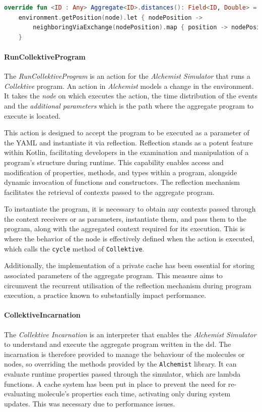\begin{lstlisting}[language=kt,label={lst:distance},caption={The implementation of the \texttt{distance} function.}]
override fun <ID : Any> Aggregate<ID>.distances(): Field<ID, Double> =
    environment.getPosition(node).let { nodePosition ->
        neighboringViaExchange(nodePosition).map { position -> nodePosition.distanceTo(position) }
    }
\end{lstlisting}

\paragraph{RunCollektiveProgram}
\label{par:run-collektive-program}
The \emph{RunCollektiveProgram} is an action for the \emph{Alchemist Simulator} that runs a \emph{Collektive} program.
An action in \emph{Alchemist} models a change in the environment.
It takes the \emph{node} on which executes the action, the time distribution of the events and the \emph{additional parameters}
which is the path where the aggregate program to execute is located.

This action is designed to accept the program to be executed as a parameter of the YAML and instantiate it via reflection.
Reflection stands as a potent feature within Kotlin, facilitating developers in the examination and manipulation of a program's structure during runtime.
This capability enables access and modification of properties, methods, and types within a program, alongside dynamic invocation of functions and constructors.
The reflection mechanism facilitates the retrieval of contexts passed to the aggregate program.

To instantiate the program, it is necessary to obtain any contexts passed through the context receivers or as parameters,
instantiate them, and pass them to the program, along with the aggregated context required for its execution.
This is where the behavior of the node is effectively defined when the action is executed, which calls the \texttt{cycle} method of \texttt{Collektive}.

Additionally, the implementation of a private cache has been essential for storing associated parameters of the aggregate program.
This measure aims to circumvent the recurrent utilisation of the reflection mechanism during program execution, a practice known to substantially impact performance.

\paragraph{CollektiveIncarnation}
The \emph{Collektive Incarnation} is an interpreter that enables the \emph{Alchemist Simulator} to understand and execute
the aggregate program written in the \ac{dsl}.
The incarnation is therefore provided to manage the behaviour of the molecules or nodes, so overriding the methods
provided by the \texttt{Alchemist} library.
It can evaluate runtime properties passed through the simulator, which are lambda functions.
A cache system has been put in place to prevent the need for re-evaluating molecule's properties each time,
activating only during system updates.
This was necessary due to performance issues.

